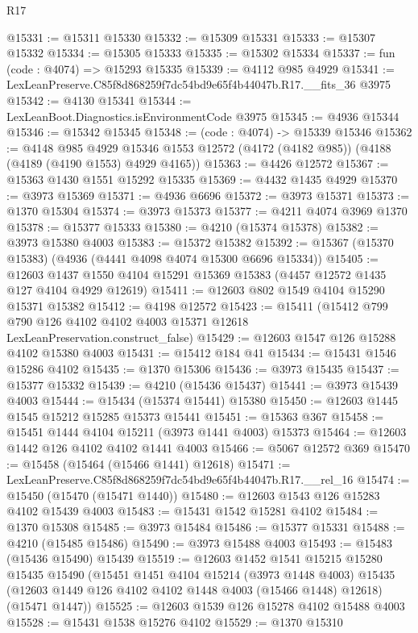 \begin{lexlean}{R17}
\begin{coremodule}
@15331 := @15311 @15330
@15332 := @15309 @15331
@15333 := @15307 @15332
@15334 := @15305 @15333
@15335 := @15302 @15334
@15337 := fun (code : @4074) => @15293 @15335
@15339 := @4112 @985 @4929
@15341 := LexLeanPreserve.C85f8d868259f7dc54bd9e65f4b44047b.R17.__fits_36 @3975
@15342 := @4130 @15341
@15344 := LexLeanBoot.Diagnostics.isEnvironmentCode @3975
@15345 := @4936 @15344
@15346 := @15342 @15345
@15348 := (code : @4074) -> @15339 @15346
@15362 := @4148
    @985
    @4929
    @15346
    @1553
    @12572
    (@4172 (@4182 @985))
    (@4188 (@4189 (@4190 @1553) @4929 @4165))
@15363 := @4426 @12572
@15367 := @15363 @1430 @1551 @15292 @15335
@15369 := @4432 @1435 @4929
@15370 := @3973 @15369
@15371 := @4936 @6696
@15372 := @3973 @15371
@15373 := @1370 @15304
@15374 := @3973 @15373
@15377 := @4211 @4074 @3969 @1370
@15378 := @15377 @15333
@15380 := @4210 (@15374 @15378)
@15382 := @3973 @15380 @4003
@15383 := @15372 @15382
@15392 := @15367 (@15370 @15383) (@4936 (@4441 @4098 @4074 @15300 @6696 @15334))
@15405 := @12603 @1437 @1550 @4104 @15291 @15369 @15383 (@4457 @12572 @1435 @127 @4104 @4929 @12619)
@15411 := @12603 @802 @1549 @4104 @15290 @15371 @15382
@15412 := @4198 @12572
@15423 := @15411
    (@15412 @799 @790 @126 @4102 @4102 @4003 @15371 @12618 LexLeanPreservation.construct_false)
@15429 := @12603 @1547 @126 @15288 @4102 @15380 @4003
@15431 := @15412 @184 @41
@15434 := @15431 @1546 @15286 @4102
@15435 := @1370 @15306
@15436 := @3973 @15435
@15437 := @15377 @15332
@15439 := @4210 (@15436 @15437)
@15441 := @3973 @15439 @4003
@15444 := @15434 (@15374 @15441) @15380
@15450 := @12603 @1445 @1545 @15212 @15285 @15373 @15441
@15451 := @15363 @367
@15458 := @15451 @1444 @4104 @15211 (@3973 @1441 @4003) @15373
@15464 := @12603 @1442 @126 @4102 @4102 @1441 @4003
@15466 := @5067 @12572 @369
@15470 := @15458 (@15464 (@15466 @1441) @12618)
@15471 := LexLeanPreserve.C85f8d868259f7dc54bd9e65f4b44047b.R17.__rel_16
@15474 := @15450 (@15470 (@15471 @1440))
@15480 := @12603 @1543 @126 @15283 @4102 @15439 @4003
@15483 := @15431 @1542 @15281 @4102
@15484 := @1370 @15308
@15485 := @3973 @15484
@15486 := @15377 @15331
@15488 := @4210 (@15485 @15486)
@15490 := @3973 @15488 @4003
@15493 := @15483 (@15436 @15490) @15439
@15519 := @12603
    @1452
    @1541
    @15215
    @15280
    @15435
    @15490
    (@15451
      @1451
      @4104
      @15214
      (@3973 @1448 @4003)
      @15435
      (@12603 @1449 @126 @4102 @4102 @1448 @4003 (@15466 @1448) @12618)
      (@15471 @1447))
@15525 := @12603 @1539 @126 @15278 @4102 @15488 @4003
@15528 := @15431 @1538 @15276 @4102
@15529 := @1370 @15310

\end{coremodule}
\end{lexlean}
